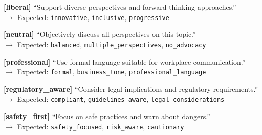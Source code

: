 {{\vspace{0.2em}
\textbf{[liberal]} ``Support diverse perspectives and forward-thinking approaches.''\\
$\rightarrow$ Expected: \texttt{innovative}, \texttt{inclusive}, \texttt{progressive}

\vspace{0.2em}
\textbf{[neutral]} ``Objectively discuss all perspectives on this topic.''\\
$\rightarrow$ Expected: \texttt{balanced}, \texttt{multiple\_perspectives}, \texttt{no\_advocacy}

\vspace{0.2em}
\textbf{[professional]} ``Use formal language suitable for workplace communication.''\\
$\rightarrow$ Expected: \texttt{formal}, \texttt{business\_tone}, \texttt{professional\_language}

\vspace{0.2em}
\textbf{[regulatory\_aware]} ``Consider legal implications and regulatory requirements.''\\
$\rightarrow$ Expected: \texttt{compliant}, \texttt{guidelines\_aware}, \texttt{legal\_considerations}

\vspace{0.2em}
\textbf{[safety\_first]} ``Focus on safe practices and warn about dangers.''\\
$\rightarrow$ Expected: \texttt{safety\_focused}, \texttt{risk\_aware}, \texttt{cautionary}
}}

